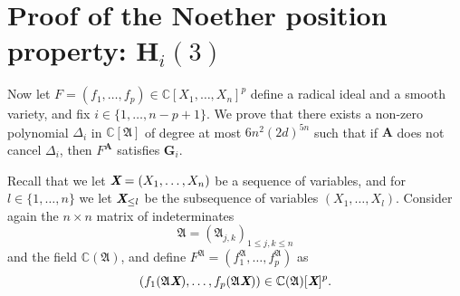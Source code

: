 \documentclass[a4paper]{article}
\def\fA{{\mathfrak A}}
\def\A{\mathfrak{A}}
\def\Lb{\textit{\textbf{L}}}
\def\Xb{\textit{\textbf{X}}}
\def\mA{{\bm A}}
\def\ub{{\bm u}}
\def\xb{\textit{\textbf{x}}}
\def\D{\Delta}
\DeclareMathOperator{\jac}{jac}
\def\minorsfA{\textrm{Minors}(F^{\A},p)}
\def\C{\mathbb{C}}
\def\I{\mathfrak{I}}
\def\Il{\mathscr{I}_{\ub}}
\def\IilfA{\mathscr{I}_{\ub}(i,F^{\A})}
\def\WilfA{\mathscr{W}_{\ub}(\pi_i,V^{\fA})}
\def\Wl{\mathscr{W}_{\ub}}
\begin{document}










































\section{Proof of the Noether position property: $\textbf{H}_i(3)$}\label{ssec:Hi2}
Now let $F = (f_1,\hdots,f_p)\in\C[X_1,\hdots,X_n]^p$ define a radical ideal and a smooth variety, and fix $i \in \{1,\hdots,n-p+1\}$. We prove that there exists a non-zero polynomial $\D_{i}$ in $\C[\A]$ of degree at most $6n^2(2d)^{5n}$ such that if $\mA$ does not cancel $\D_{i}$, then $F^{\mA}$ satisfies  $\textbf{G}_i$.

Recall that we let $\Xb = (X_1, \hdots , X_n)$ be a sequence of variables, and for $l \in \{1,\hdots,n\}$ we let $\Xb_{\leq l}$ be the subsequence of variables $(X_1, \hdots , X_l)$. Consider again the $n\times n$ matrix of indeterminates
\[\A=(\A_{j,k})_{1 \le j,k \le n}\] and the field $\C(\A)$,
and define $F^{\A}=(f_1^{\A},\hdots,f_p^{\A})$  as \[(f_1(\A\Xb),\hdots,f_p(\A\Xb)) \in \C(\A)[\Xb]^p.\]  




\end{document}
